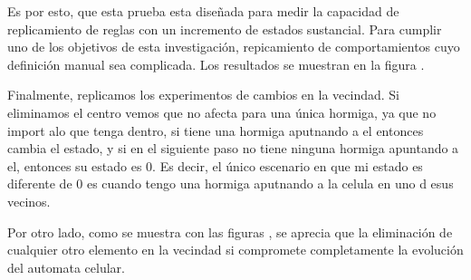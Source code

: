Es por esto, que esta prueba esta diseñada para medir la capacidad de replicamiento de reglas con un incremento de estados sustancial. Para cumplir uno de los objetivos de esta investigación, repicamiento de comportamientos cuyo definición manual sea complicada. Los resultados se muestran en la figura \TODO{}.


Finalmente, replicamos los experimentos de cambios en la vecindad. Si eliminamos el centro vemos que no afecta para una única hormiga, ya que no import alo que tenga dentro, si tiene una hormiga aputnando a el entonces cambia el estado, y si en el siguiente paso no tiene ninguna hormiga apuntando a el, entonces su estado es 0. Es decir, el único escenario en que mi estado es diferente de 0 es cuando tengo una hormiga aputnando a la celula en uno d esus vecinos.


Por otro lado, como se muestra con las figuras \TODO{}, se aprecia que la eliminación de cualquier otro elemento en la vecindad si compromete completamente la evolución del automata celular.
